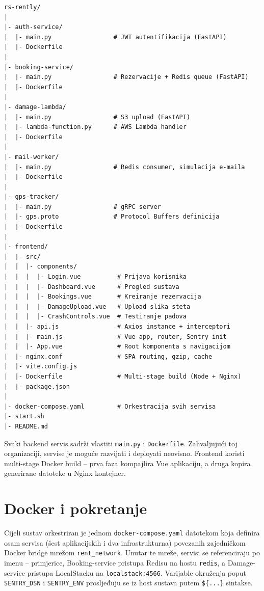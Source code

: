 \documentclass[12pt,a4paper]{article}
\begin{document}
\begin{lstlisting}[caption={Direktorijska struktura projekta}]
rs-rently/
|
|- auth-service/
|  |- main.py                 # JWT autentifikacija (FastAPI)
|  |- Dockerfile
|
|- booking-service/
|  |- main.py                 # Rezervacije + Redis queue (FastAPI)
|  |- Dockerfile
|
|- damage-lambda/
|  |- main.py                 # S3 upload (FastAPI)
|  |- lambda-function.py      # AWS Lambda handler
|  |- Dockerfile
|
|- mail-worker/
|  |- main.py                 # Redis consumer, simulacija e-maila
|  |- Dockerfile
|
|- gps-tracker/
|  |- main.py                 # gRPC server
|  |- gps.proto               # Protocol Buffers definicija
|  |- Dockerfile
|
|- frontend/
|  |- src/
|  |  |- components/
|  |  |  |- Login.vue          # Prijava korisnika
|  |  |  |- Dashboard.vue      # Pregled sustava
|  |  |  |- Bookings.vue       # Kreiranje rezervacija
|  |  |  |- DamageUpload.vue   # Upload slika steta
|  |  |  |- CrashControls.vue  # Testiranje padova
|  |  |- api.js                # Axios instance + interceptori
|  |  |- main.js               # Vue app, router, Sentry init
|  |  |- App.vue               # Root komponenta s navigacijom
|  |- nginx.conf               # SPA routing, gzip, cache
|  |- vite.config.js
|  |- Dockerfile               # Multi-stage build (Node + Nginx)
|  |- package.json
|
|- docker-compose.yaml         # Orkestracija svih servisa
|- start.sh
|- README.md
\end{lstlisting}

Svaki backend servis sadrži vlastiti \texttt{main.py} i \texttt{Dockerfile}. Zahvaljujući toj organizaciji, servise je moguće razvijati i deployati neovisno. Frontend koristi multi-stage Docker build -- prva faza kompajlira Vue aplikaciju, a druga kopira generirane datoteke u Nginx kontejner.

\section{Docker i pokretanje}

Cijeli sustav orkestriran je jednom \texttt{docker-compose.yaml} datotekom koja definira osam servisa (šest aplikacijskih i dva infrastrukturna) povezanih zajedničkom Docker bridge mrežom \texttt{rent\_network}. Unutar te mreže, servisi se referenciraju po imenu -- primjerice, Booking-service pristupa Redisu na hostu \texttt{redis}, a Damage-service pristupa LocalStacku na \texttt{localstack:4566}. Varijable okruženja poput \texttt{SENTRY\_DSN} i \texttt{SENTRY\_ENV} prosljeđuju se iz host sustava putem \texttt{\$\{...\}} sintakse.
\end{document}
